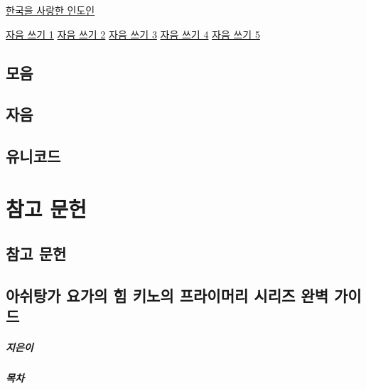 \documentclass[12pt, a4paper, oneside]{book}
\let\stdsection\section
\renewcommand\section{\newpage\stdsection}
\begin{document}
	\href{https://www.youtube.com/channel/UCoJOZqb7VzOv-nL0r9-EaTg}{한국을 사랑한 인도인}

	\href{https://www.youtube.com/watch?v=N7zYgG6JxPg}{자음 쓰기 1}
	\href{https://www.youtube.com/watch?v=yvLmgVnGaOs}{자음 쓰기 2}
	\href{https://www.youtube.com/watch?v=TohXp9qSgeQ&t=2s}{자음 쓰기 3}
	\href{https://www.youtube.com/watch?v=yhL2FyehmGo}{자음 쓰기 4}
	\href{https://www.youtube.com/watch?v=mlDiVqy-_KU}{자음 쓰기 5}


	\section{모음}


	\section{자음}




	\section{유니코드}



	\chapter{참고 문헌}

%
	\section{참고 문헌}

%
	\section{아쉬탕가 요가의 힘 키노의 프라이머리 시리즈 완벽 가이드}


	\paragraph{지은이} 
	\paragraph{목차} 
\end{document}
